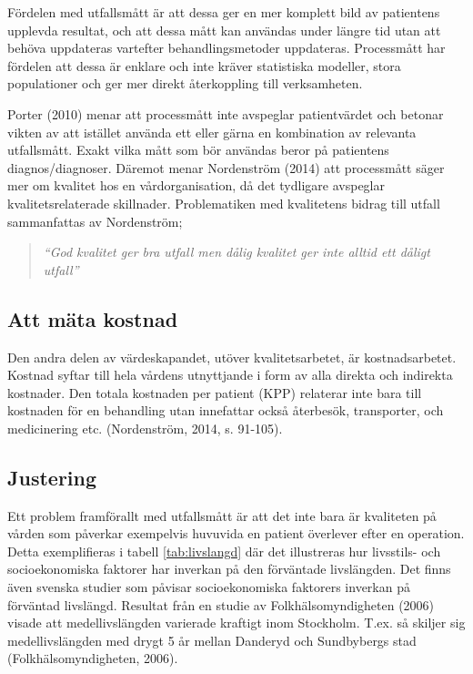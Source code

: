 Fördelen med utfallsmått är att dessa ger en mer komplett bild av patientens upplevda resultat, och att dessa mått kan användas under längre tid utan att behöva uppdateras vartefter behandlingsmetoder  uppdateras. Processmått har fördelen att dessa är enklare och inte kräver statistiska modeller, stora populationer och ger mer direkt återkoppling till verksamheten. 
 
Porter (2010) menar att processmått inte avspeglar patientvärdet och betonar vikten av att istället använda ett eller gärna en kombination av relevanta utfallsmått. Exakt vilka mått som bör användas beror på patientens diagnos/diagnoser. Däremot menar Nordenström (2014) att processmått säger mer om kvalitet hos en vårdorganisation, då det tydligare avspeglar kvalitetsrelaterade skillnader. Problematiken med kvalitetens bidrag till utfall sammanfattas av Nordenström;
\begin{quotation}
\textit{“God kvalitet ger bra utfall men dålig kvalitet ger inte alltid ett dåligt utfall”}
\end{quotation}

\subsection{Att mäta kostnad}

Den andra delen av värdeskapandet, utöver kvalitetsarbetet, är kostnadsarbetet. Kostnad syftar till hela vårdens utnyttjande i form av alla direkta och indirekta kostnader. Den totala kostnaden per patient (KPP) relaterar inte bara till kostnaden för en behandling utan innefattar också återbesök, transporter, och medicinering etc. (Nordenström, 2014, s. 91-105). 

\subsection{Justering}

Ett problem framförallt med utfallsmått är att det inte bara är kvaliteten på vården som påverkar exempelvis huvuvida en patient överlever efter en operation. Detta exemplifieras i tabell \ref{tab:livslangd} där det illustreras hur livsstils- och socioekonomiska faktorer har inverkan på den förväntade livslängden. Det finns även svenska studier som påvisar socioekonomiska faktorers inverkan på förväntad livslängd. Resultat från en studie av Folkhälsomyndigheten (2006) visade att medellivslängden varierade kraftigt inom Stockholm. T.ex. så skiljer sig medellivslängden med drygt 5 år mellan Danderyd och Sundbybergs stad (Folkhälsomyndigheten, 2006).

